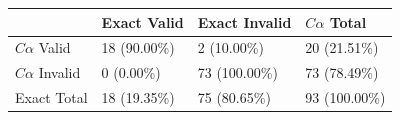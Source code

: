 \begin{tabular}{llll}
\toprule
 & Exact Valid & Exact Invalid & $C\alpha$ Total \\
\midrule
$C\alpha$ Valid & 18 (90.00\%) & 2 (10.00\%) & 20 (21.51\%) \\
$C\alpha$ Invalid & 0 (0.00\%) & 73 (100.00\%) & 73 (78.49\%) \\
Exact Total & 18 (19.35\%) & 75 (80.65\%) & 93 (100.00\%) \\
\bottomrule
\end{tabular}
